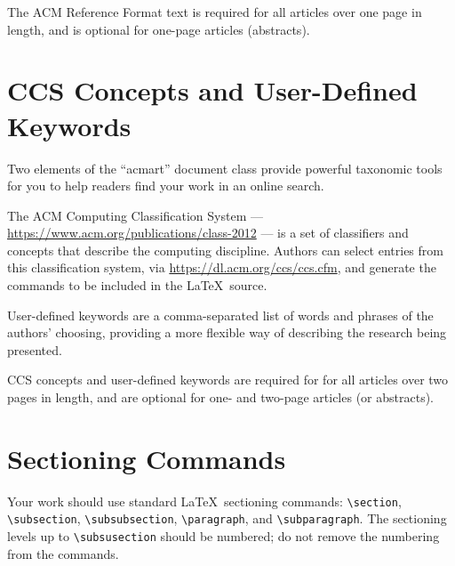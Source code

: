 \documentclass[acmsmall]{acmart}
\begin{document}
	The ACM Reference Format text is required for all articles over one
	page in length, and is optional for one-page articles (abstracts).
	
	\section{CCS Concepts and User-Defined Keywords}
	
	Two elements of the ``acmart'' document class provide powerful
	taxonomic tools for you to help readers find your work in an online
	search.
	
	The ACM Computing Classification System ---
	\url{https://www.acm.org/publications/class-2012} --- is a set of
	classifiers and concepts that describe the computing
	discipline. Authors can select entries from this classification
	system, via \url{https://dl.acm.org/ccs/ccs.cfm}, and generate the
	commands to be included in the \LaTeX\ source.
	
	User-defined keywords are a comma-separated list of words and phrases
	of the authors' choosing, providing a more flexible way of describing
	the research being presented.
	
	CCS concepts and user-defined keywords are required for for all
	articles over two pages in length, and are optional for one- and
	two-page articles (or abstracts).
	
	\section{Sectioning Commands}
	
	Your work should use standard \LaTeX\ sectioning commands:
	\verb|\section|, \verb|\subsection|, \verb|\subsubsection|,
	\verb|\paragraph|, and \verb|\subparagraph|. The sectioning levels up to
	\verb|\subsusection| should be numbered; do not remove the numbering
	from the commands.
	
\end{document}
